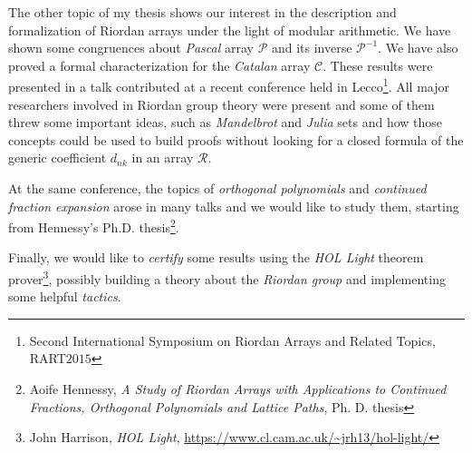  The other topic of
my thesis shows our interest in the description and formalization of Riordan
arrays under the light of modular arithmetic. We have shown some congruences
about \emph{Pascal} array $\mathcal{P}$ and its inverse $\mathcal{P}^{-1}$. We
have also proved a formal characterization for the \emph{Catalan} array
$\mathcal{C}$. These results were presented in a talk contributed at a recent
conference held in Lecco\footnote{Second International Symposium on Riordan
Arrays and Related Topics, RART$2015$}. All major researchers involved in
Riordan group theory were present and some of them threw some important ideas,
such as \emph{Mandelbrot} and \emph{Julia} sets and how those concepts could be
used to build proofs without looking for a closed formula of the generic
coefficient $d_{nk}$ in an array $\mathcal{R}$.  

At the same conference, the topics of \emph{orthogonal polynomials}
and \emph{continued fraction expansion} arose in many talks and we would like
to study them, starting from Hennessy's Ph.D. thesis\footnote{Aoife Hennessy,
\emph{A Study of Riordan Arrays with Applications to Continued Fractions,
Orthogonal Polynomials and Lattice Paths}, Ph.  D.  thesis}.

Finally, we would like to \emph{certify} some results using the \emph{HOL
Light} theorem prover\footnote{John Harrison, \emph{HOL Light},
\url{https://www.cl.cam.ac.uk/~jrh13/hol-light/}}, possibly building a theory
about the \emph{Riordan group} and implementing some helpful \emph{tactics}.




